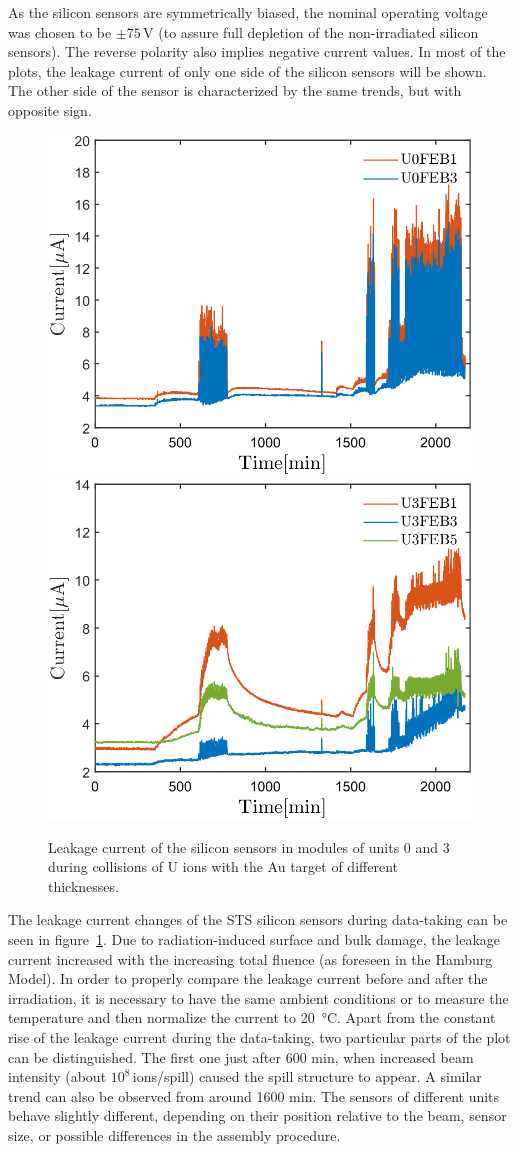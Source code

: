 As the silicon sensors are symmetrically biased, the nominal operating voltage was chosen to be $\pm75$\,V (to assure full depletion of the non-irradiated silicon sensors). The reverse polarity also implies negative current values. In most of the plots, the leakage current of only one side of the silicon sensors will be shown. The other side of the sensor is characterized by the same trends, but with opposite sign.

\begin{figure}[!h]
\centering
\includegraphics[width=0.45\columnwidth]{Chapter6/DCS/images/uranium/U0.png}
\includegraphics[width=0.45\columnwidth]{Chapter6/DCS/images/uranium/U3.png}
\caption{Leakage current of the silicon sensors in modules of units 0 and 3 during collisions of U ions with the Au target of different thicknesses.}
\label{fig_msts_LC}
\end{figure}

The leakage current changes of the \gls{STS} silicon sensors during data-taking can be seen in figure~\ref{fig_msts_LC}. Due to radiation-induced surface and bulk damage, the leakage current  increased with the increasing total fluence (as foreseen in the Hamburg Model). In order to properly compare the leakage current before and after the irradiation, it is necessary to have the same ambient conditions or to measure the temperature and then normalize the current to \SI{20}{\celsius}. Apart from the constant rise of the leakage current during the data-taking, two particular parts of the plot can be distinguished. The first one just after 600 min, when increased beam intensity (about $10^{8}$\,ions/spill) caused the spill structure to appear. A similar trend can also be observed from around 1600 min. The sensors of different units behave slightly different, depending on their position relative to the beam, sensor size, or possible differences in the assembly procedure.


